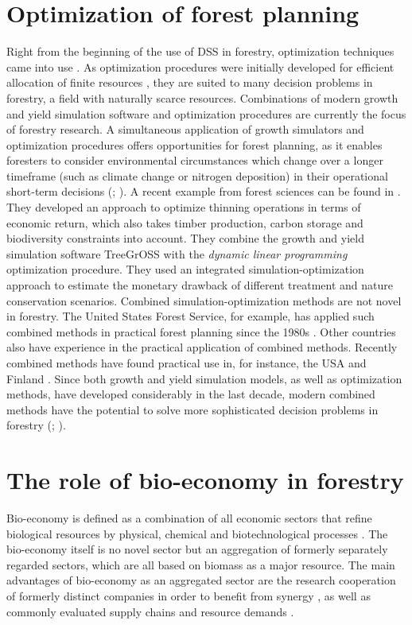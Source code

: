 \section{Optimization of forest planning}
\label{sec:intro:opt}
Right from the beginning of the use of DSS in forestry, optimization techniques came into use \citep[p. 16]{kangas_2015}. As optimization procedures were initially developed for efficient allocation of finite resources \citep[p. 271]{davis_2001}, they are suited to many decision problems in forestry, a field with naturally scarce resources. Combinations of modern growth and yield simulation software and optimization procedures are currently the focus of forestry research. A simultaneous application of growth simulators and optimization procedures offers opportunities for forest planning, as it enables foresters to consider environmental circumstances which change over a longer timeframe (such as climate change or nitrogen deposition) in their operational short-term decisions (\citealp[p. 346-347]{mohring_2010}; \citealp[p. 1081]{pretzsch_2008}). A recent example from forest sciences can be found in \citet{yousefpour_2009}. They developed an approach to optimize thinning operations in terms of economic return, which also takes timber production, carbon storage and biodiversity constraints into account. They combine the growth and yield simulation software TreeGrOSS with the \textit{dynamic linear programming} optimization procedure. They used an integrated si\-mu\-la\-tion-op\-ti\-mi\-za\-tion approach to estimate the monetary drawback of different treatment and nature conservation scenarios. Combined si\-mu\-la\-tion-op\-ti\-mi\-za\-tion methods are not novel in forestry. The United States Forest Service, for example, has applied such combined methods in practical forest planning since the 1980s \citep[p. 33]{hoganson_2015}. Other countries also have experience in the practical application of combined methods. Recently combined methods have found practical use in, for instance, the USA and Finland \citep[p. 41]{hoganson_2015}. Since both growth and yield simulation models, as well as optimization methods, have developed considerably in the last decade, modern combined methods have the potential to solve more sophisticated decision problems in forestry (\citealp[p. 16-17]{kangas_2015}; \citealp[p. 93]{muys_2010}).

\section{The role of bio-economy in forestry}
\label{sec:intro:biecon}
Bio-economy is defined as a combination of all economic sectors that refine biological resources by physical, chemical and biotechnological processes \citep[p. 10462]{debesi_2015}. The bio-economy itself is no novel sector but an aggregation of formerly separately regarded sectors, which are all based on biomass as a major resource. The main advantages of bio-economy as an aggregated sector are the research cooperation of formerly distinct companies in order to benefit from synergy \citep[p. 1]{auer_2016}, as well as commonly evaluated supply chains and resource demands \citep[p. 3]{geldermann_2016}.

